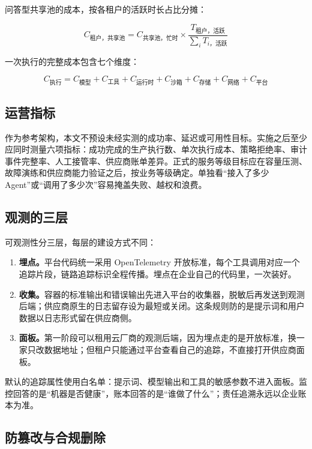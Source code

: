 问答型共享池的成本，按各租户的活跃时长占比分摊：

\[
  C_{\text{租户，共享池}}
  =
  C_{\text{共享池，忙时}}
  \times
  \frac{T_{\text{租户，活跃}}}{\sum_i T_{i\text{，活跃}}}
\]

一次执行的完整成本包含七个维度：

\[
  C_{\text{执行}}
  = C_{\text{模型}}
  + C_{\text{工具}}
  + C_{\text{运行时}}
  + C_{\text{沙箱}}
  + C_{\text{存储}}
  + C_{\text{网络}}
  + C_{\text{平台}}
\]

\subsection{运营指标}

作为参考架构，本文不预设未经实测的成功率、延迟或可用性目标。实施之后至少应同时测量六项指标：成功完成的生产执行数、单次执行成本、策略拒绝率、审计事件完整率、人工接管率、供应商账单差异。正式的服务等级目标应在容量压测、故障演练和供应商能力验证之后，按业务等级确定。单独看“接入了多少 Agent”或“调用了多少次”容易掩盖失败、越权和浪费。

\subsection{观测的三层}

可观测性分三层，每层的建设方式不同：

\begin{enumerate}
  \item \textbf{埋点。}平台代码统一采用 OpenTelemetry 开放标准，每个工具调用对应一个追踪片段，链路追踪标识全程传播。埋点在企业自己的代码里，一次装好。
  \item \textbf{收集。}容器的标准输出和错误输出先进入平台的收集器，脱敏后再发送到观测后端；供应商原生的日志留存设为最短或关闭。这条规则防的是提示词和用户数据以日志形式留在供应商侧。
  \item \textbf{面板。}第一阶段可以租用云厂商的观测后端，因为埋点走的是开放标准，换一家只改数据地址；但租户只能通过平台查看自己的追踪，不直接打开供应商面板。
\end{enumerate}

默认的追踪属性使用白名单：提示词、模型输出和工具的敏感参数不进入面板。监控回答的是“机器是否健康”，账本回答的是“谁做了什么”；责任追溯永远以企业账本为准。

\subsection{防篡改与合规删除}

